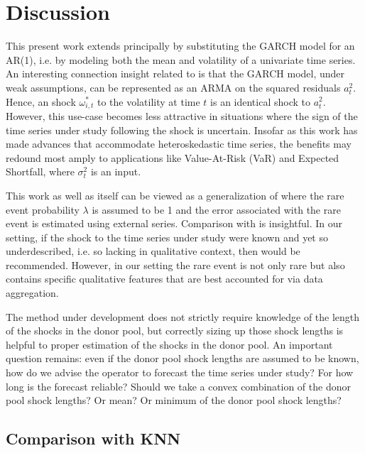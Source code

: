 \documentclass[11pt,3p,review,authoryear]{elsarticle}
\theoremstyle{definition}
\begin{document}
\section{Discussion}

This present work extends \citet{lin2021minimizing} principally by substituting the GARCH model for an AR(1), i.e. by modeling both the mean and volatility of a univariate time series.  An interesting connection insight related to \citet{lin2021minimizing} is that the GARCH model, under weak assumptions, can be represented as an ARMA on the squared residuals $a^{2}_{t}$.  Hence, an shock $\omega^{*}_{i,t}$ to the volatility at time $t$ is an identical shock to $a^{2}_{t}$. However, this use-case becomes less attractive in situations where the sign of the time series under study following the shock is uncertain.  Insofar as this work has made advances that accommodate heteroskedastic time series, the benefits may redound most amply to applications like Value-At-Risk (VaR) and Expected Shortfall, where $\sigma^{2}_{t}$ is an input.

This work as well as \citet{lin2021minimizing} itself can be viewed as a generalization of \cite{phillips1996forecasting} where the rare event probability $\lambda$ is assumed to be 1 and the error associated with the rare event is estimated using external series.  Comparison with \citet{phillips1996forecasting} is insightful.  In our setting, if the shock to the time series under study were known and yet so underdescribed, i.e. so lacking in qualitative context, then \cite{phillips1996forecasting} would be recommended.  However, in our setting the rare event is not only rare but also contains specific qualitative features that are best accounted for via data aggregation.

The method under development does not strictly require knowledge of the length of the shocks in the donor pool, but correctly sizing up those shock lengths is helpful to proper estimation of the shocks in the donor pool.  An important question remains: even if the donor pool shock lengths are assumed to be known, how do we advise the operator to forecast the time series under study?  For how long is the forecast reliable?  Should we take a convex combination of the donor pool shock lengths?  Or mean? Or minimum of the donor pool shock lengths?

\subsection{Comparison with KNN}
\end{document}
